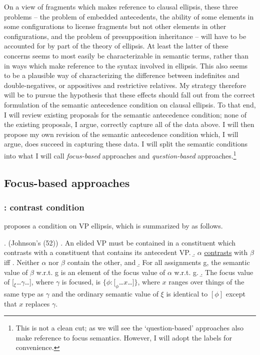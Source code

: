 \documentclass[doublespace]{umthesis}
\begin{document}
On a view of fragments which makes reference to clausal ellipsis, these three problems -- the problem of embedded antecedents, the ability of some elements in some configurations to license fragments but not other elements in other configurations, and the problem of presupposition inheritance -- will have to be accounted for by part of the theory of ellipsis. At least the latter of these concerns seems to most easily be characterizable in semantic terms, rather than in ways which make reference to the syntax involved in ellipsis.%
This also seems to be a plausible way of characterizing the difference between indefinites and double-negatives, or appositives and restrictive relatives. My strategy therefore will be to pursue the hypothesis that these effects should fall out from the correct formulation of the semantic antecedence condition on clausal ellipsis. To that end, I will review existing proposals for the semantic antecedence condition; none of the existing proposals, I argue, correctly capture all of the data above. I will then propose my own revision of the semantic antecedence condition which, I will argue, does succeed in capturing these data. I will split the semantic conditions into what I will call {\it focus-based} approaches and {\it question-based} approaches.\footnote{This is not a clean cut; as we will see the `question-based' approaches also make reference to focus semantics. However, I will adopt the labels for convenience.}

\subsection{Focus-based approaches}

\subsubsection{\cite{Ro92}: contrast condition}

\cite{Ro92} proposes a condition on VP ellipsis, which is summarized by \cite{Joh01} as follows.

\ex. (Johnson's (52))
	\a. An elided VP must be contained in a constituent which contrasts with a constituent that contains its antecedent VP.
	\b. $\alpha$ \underline{contrasts} with $\beta$ iff
		\a. Neither $\alpha$ nor $\beta$ contain the other, and
		\b. For all assignments g, the semantic value of $\beta$ w.r.t. g is an element of the focus value of $\alpha$ w.r.t. g.
		\b. The focus value of [$_{\xi}$\ldots$\gamma$\ldots], where $\gamma$ is focused, is $\{\phi: [_{\phi}$\ldots$x$\ldots$]\}$, where $x$ ranges over things of the same type as $\gamma$ and the ordinary semantic value of $\xi$ is identical to $[\phi]$ except that $x$ replaces $\gamma$.
		
\end{document}
